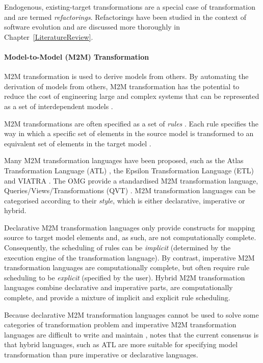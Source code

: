 Endogenous, existing-target transformations are a special case of transformation and are termed \emph{refactorings}. Refactorings have been studied in the context of software evolution and are discussed more thoroughly in Chapter~\ref{LiteratureReview}.


\paragraph{Model-to-Model (M2M) Transformation} M2M transformation is used to derive models from others. By automating the derivation of models from others, M2M transformation has the potential to reduce the cost of engineering large and complex systems that can be represented as a set of interdependent models \cite{sendall03heart}. 

M2M transformations are often specified as a set of \emph{rules} \cite{czarnecki06survey}. Each rule specifies the way in which a specific set of elements in the source model is transformed to an equivalent set of elements in the target model \cite[pg.44]{kolovos09thesis}.

Many M2M transformation languages have been proposed, such as the Atlas Transformation Language (ATL) \cite{jouault05transforming}, the Epsilon Transformation Language (ETL) \cite{kolovos08etl} and VIATRA \cite{viatra}. The OMG \cite{omg} provide a standardised M2M transformation language, Queries/Views/Transformations (QVT) \cite{qvt}. M2M transformation languages can be categorised according to their \emph{style}, which is either declarative, imperative or hybrid.

Declarative M2M transformation languages only provide constructs for mapping source to target model elements and, as such, are not computationally complete. Consequently, the scheduling of rules can be \emph{implicit} (determined by the execution engine of the transformation language). By contrast, imperative M2M transformation languages are computationally complete, but often require rule scheduling to be \emph{explicit} (specified by the user). Hybrid M2M transformation languages combine declarative and imperative parts, are computationally complete, and provide a mixture of implicit and explicit rule scheduling.

Because declarative M2M transformation languages cannot be used to solve some categories of transformation problem \cite{patrascoiu04embedding} and imperative M2M transformation languages are difficult to write and maintain \cite[pg.45]{kolovos09thesis}, \cite{kolovos08etl} notes that the current consensus is that hybrid languages, such as ATL are more suitable for specifying model transformation than pure imperative or declarative languages.

